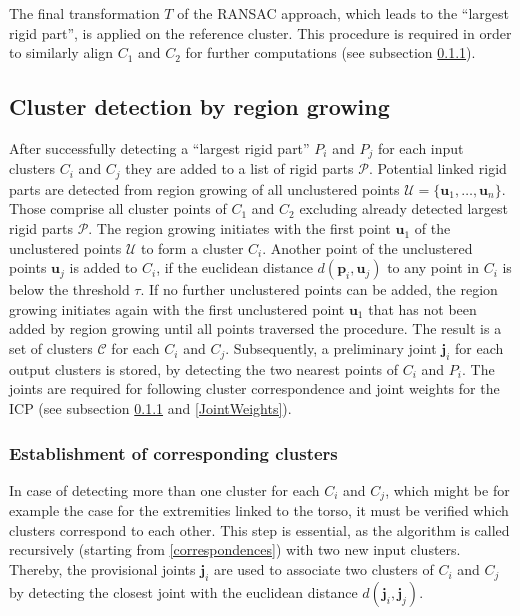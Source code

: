 The final transformation $T$ of the RANSAC approach, which leads to the ``largest rigid part'', is applied on the reference cluster. This procedure is required in order to similarly align $C_1$ and $C_2$ for further computations (see subsection \ref{CorrespondingClusters}).

\subsection{Cluster detection by region growing}
\label{cluster}
After successfully detecting a ``largest rigid part'' $P_i$ and $P_j$ for each input clusters $C_i$ and $C_j$ they are added to a list of rigid parts $\mathcal{P}$. Potential linked rigid parts are detected from region growing of all unclustered points $\mathcal{U} =  \{\boldsymbol{u}_1,\ldots,\boldsymbol{u}_n\}$. Those comprise all cluster points of $C_1$ and $C_2$ excluding already detected largest rigid parts $\mathcal{P}$. The region growing initiates with the first point $\boldsymbol{u}_1$ of the unclustered points $\mathcal{U}$ to form a cluster $C_i$. Another point of the unclustered points $\boldsymbol{u}_j$ is added to $C_i$, if the euclidean distance $d(\boldsymbol{p}_i,\boldsymbol{u}_j)$ to any point in $C_i$ is below the threshold $\tau$. If no further unclustered points can be added, the region growing initiates again with the first unclustered point $\boldsymbol{u}_1$ that has not been added by region growing until all points traversed the procedure. The result is a set of clusters $\mathcal{C}$ for each $C_i$ and $C_j$. Subsequently, a preliminary joint $\boldsymbol{j}_i$ for each output clusters is stored, by detecting the two nearest points of $C_i$ and $P_i$. The joints are required for following cluster correspondence and joint weights for the ICP (see subsection \ref{CorrespondingClusters} and \ref{JointWeights}).

\subsubsection{Establishment of corresponding clusters}
\label{CorrespondingClusters}
In case of detecting more than one cluster for each $C_i$ and $C_j$, which might be for example the case for the extremities linked to the torso, it must be verified which clusters correspond to each other. This step is essential, as the algorithm is called recursively (starting from \ref{correspondences}) with two new input clusters. Thereby, the provisional joints $\boldsymbol{j}_i$ are used to associate two clusters of $C_i$ and $C_j$ by detecting the closest joint with the euclidean distance $d(\boldsymbol{j}_i,\boldsymbol{j}_j)$.

